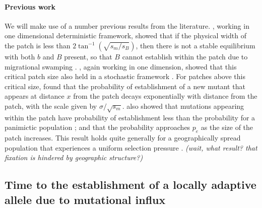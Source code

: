 \documentclass{article}
\newcommand{\plr}[1]{{\it\color{blue}(#1)}}
\begin{document}
\paragraph{Previous work} 
We will make use of a number previous results from the literature. 
\citet{slatkin1973geneflow}, working in one dimensional deterministic framework, 
showed that if the physical width of the patch is less than $2 \tan^{-1} (\sqrt{s_m/s_B})$, 
then there is not a stable equilibrium with both $b$ and $B$ present,
so that $B$ cannot establish within the patch due to migrational swamping \citep[see also][ for a review]{Lenormand}.
\citet{barton1987establishment}, again working in one dimension,
showed that this critical patch size also held in a stochastic framework \citep[see also the work of][]{Polk}. 
For patches above this critical size, \citet{barton1987establishment}
found that the probability of establishment of a new mutant that appears at distance $x$ from the patch
decays exponentially with distance from the patch, with the scale given by $\sigma/\sqrt{s_m}$.
\citet{barton1987establishment} also showed that mutations appearing within the patch have probability of establishment
less than the probability for a panimictic population 
\citep[which we denote $p_e$, and often approximate by $2 s_B / \xi^2$][]{haldane,fisher};
and that the probability approaches $p_e$ as the size of the patch increases.
This result holds quite generally for a geographically spread population that experiences a uniform selection
pressure \citep{Maruyama,cherry}. 
\plr{wait, what result? that fixation is hindered by geographic structure?}






\subsection{Time to the establishment of a locally adaptive allele
  due to mutational influx}
\label{ss:patchymutation}
\end{document}
